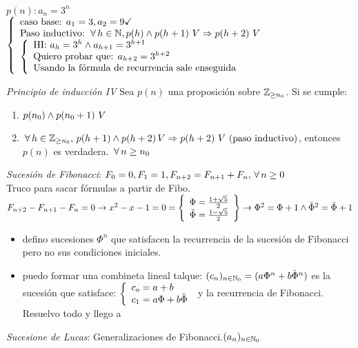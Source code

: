 \documentclass[12pt,a4paper, spanish]{article}
\begin{document}
$p(n): a_n = 3^n$\\

$\llave{l}{
		\text{caso base: } a_1 = 3, a_2 =9 \checkmark\\
		\text{Paso inductivo: } \paratodo h \en \naturales, p(h) \y p(h+1) \ V \entonces p(h+2)\ V\\

		\llave{l}{
			\text{HI: }  a_h = 3^h \y a_{h+1} = 3^{h+1}\\
			\text{Quiero probar que: } a_{h+2}= 3^{h+2}\\
			\text{Usando la fórmula de recurrencia sale enseguida}
		}
	}
$

\textit{Principio de inducción IV } Sea $p(n)$ una proposición sobre $\enteros_{\geq n_0}$. Si se cumple:
\begin{enumerate}
	\item  $p(n_0) \y p(n_0 + 1) \ V$
	\item $\paratodo h \en \enteros_{\geq n_0},\, p(h+1) \y p(h+2)\, V \entonces p(h+2)\ V\ (\text{paso inductivo})$,
	      entonces $p(n)$ es verdadera. $\paratodo n \geq n_0$\\
\end{enumerate}


\textit{Sucesión de Fibonacci}: $F_0 = 0, F_1 = 1, F_{n+2} = F_{n+1} + F_n, \paratodo n \geq 0$\\
Truco para sacar fórmulas a partir de Fibo.\\
$F_{n+2} - F_{n+1} - F_n = 0 \to x^2 - x -1 = 0 =
	\llaves{ l }{
		\Phi = \frac{1+\sqrt{5}}{2}\\
		\tilde\Phi = \frac{1-\sqrt{5}}{2}\\
	} \to \Phi^2 = \Phi + 1 \y \tilde\Phi^2  =\tilde\Phi + 1 $
\begin{itemize}
	\item  defino sucesiones $\Phi^n$ que satisfacen la recurrencia de la sucesión de Fibonacci pero no sus condiciones iniciales.
	\item puedo formar una combineta lineal talque: $(c_n)_{n\en \naturales_0} = (a\Phi^n + b\tilde\Phi^n)$ es la sucesión que satisface:
	      $\llave{ l }{
			      c_o = a+b\\
			      c_1 = a\Phi + b\tilde\Phi
		      }$ y la recurrencia de Fibonacci.\\
	      Resuelvo todo y llego a $\boxed{}$
\end{itemize}

\textit{Sucesione de Lucas}: Generalizaciones de Fibonacci.$(a_n)_{n\in\naturales_0}$\\
\end{document}
